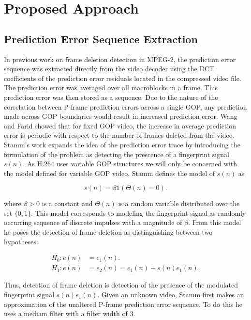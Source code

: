 \chapter{Proposed Approach}

\section{Prediction Error Sequence Extraction}

In previous work on frame deletion detection in MPEG-2, the prediction error sequence was extracted directly from the video decoder using the DCT coefficients of the prediction error residuals located in the compressed video file. The prediction error was averaged over all macroblocks in a frame. This prediction error was then stored as a sequence. Due to the nature of the correlation between P-frame prediction errors across a single GOP, any prediction made across GOP boundaries would result in increased prediction error. Wang and Farid showed that for fixed GOP video, the increase in average prediction error is periodic with respect to the number of frames deleted from the video. Stamm's work expands the idea of the prediction error trace by introducing the formulation of the problem as detecting the prescence of a fingerprint signal $s(n)$. As H.264 uses variable GOP structures we will only be concerned with the model defined for variable GOP video. Stamm defines the model of $s(n)$ as

\begin{equation}
s(n) = \beta \mathds{1} \left( \Theta(n) = 0 \right).
\label{stammModel}
\end{equation}

where $\beta > 0$ is a constant and $\Theta(n)$ is a random variable distributed over the set $\{0, 1\}$. This model corresponds to modeling the fingerprint signal as randomly occurring sequence of discrete impulses with a magnitude of $\beta$. From this model he poses the detection of frame deletion as distinguishing between two hypotheses:

\begin{equation}
\begin{aligned}
  H_{0} : e(n) &= e_{1}(n). \\
  H_{1} : e(n) &= e_{2}(n) = e_{1}(n) + s(n)e_{1}(n).
\end{aligned}
\end{equation}

Thus, detection of frame deletion is detection of the presence of the modulated fingerprint signal $s(n)e_{1}(n)$. Given an unknown video, Stamm first makes an approximation of the unaltered P-frame prediction error sequence. To do this he uses a mediam filter with a filter width of 3.

